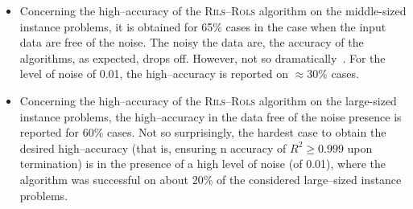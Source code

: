 \documentclass[a4paper,12pt]{elsarticle}
\begin{document}
\begin{itemize}
	 \item Concerning the high--accuracy of the \textsc{Rils}--\textsc{Rols} algorithm on the middle-sized instance problems, it is obtained for 65\% cases in the case when the input data are free of the noise.  The noisy the data are, the accuracy of the algorithms, as expected, drops off. However, not so dramatically~. For the level of noise of 0.01, the high--accuracy is reported on $\approx$30\% cases.
	 
	 \item Concerning the high--accuracy of the \textsc{Rils}--\textsc{Rols} algorithm on the large-sized instance problems,  the high--accuracy in the data free of the noise presence is reported for 60\% cases. Not so surprisingly, the hardest case to obtain the desired high--accuracy (that is, ensuring n accuracy of $R^2\geq 0.999$ upon termination) is in the presence of a high level of noise (of 0.01), where the algorithm was successful on about 20\% of the considered large--sized instance problems. 
	 
\end{itemize}

\begin{center}
\label{fig:compExact_noise_size}
\end{center}
\end{document}
